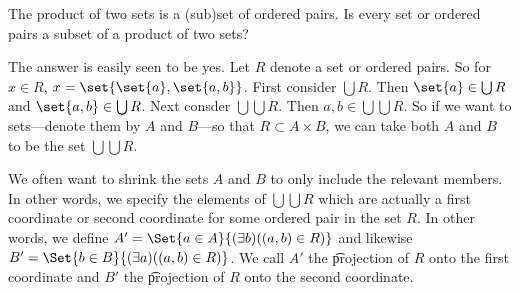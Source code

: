 

The product of two sets is a (sub)set of ordered pairs.
Is every set or ordered pairs a subset of a product of two sets?


The answer is easily seen to be yes.
Let $R$ denote a set or ordered pairs.
So for $x \in R$, $x = \set{\set{a}, \set{a, b}}$.
First consider $\bigcup R$.
Then $\set{a} \in \bigcup R$ and $\set{a, b} \in \bigcup R$.
Next consder $\bigcup\bigcup R$.
Then $a, b \in \bigcup\bigcup R$.
So if we want to sets---denote them by $A$ and $B$---so that $R \subset A \times B$, we can take both $A$ and $B$ to be the set $\bigcup\bigcup R$.

We often want to shrink the sets $A$ and $B$ to only include the relevant members.
In other words, we specify the elements of $\bigcup\bigcup R$ which are actually a first coordinate or second coordinate for some ordered pair in the set $R$.
In other words, we define $A' = \Set{a \in A}{(\exists b)((a, b) \in R)}$ and likewise $B' = \Set{b \in B}{(\exists a)((a, b) \in R)}$.
We call $A'$ the \t{projection of $R$ onto the first coordinate} and $B'$ the \t{projection of $R$ onto the second coordinate.}


\blankpage
